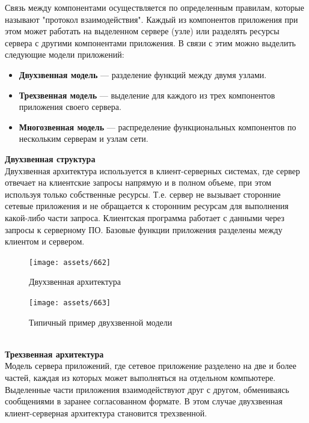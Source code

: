 Связь между компонентами осуществляется по определенным правилам, которые называют "протокол взаимодействия".
Каждый из компонентов приложения при этом может работать на выделенном сервере (узле) или разделять ресурсы сервера
с другими компонентами приложения. В связи с этим можно выделить следующие модели приложений:

\begin{itemize} 
    \item \textbf{Двухзвенная модель} — разделение функций между двумя узлами. 
    \item \textbf{Трехзвенная модель} — выделение для каждого из трех компонентов приложения своего сервера. 
    \item \textbf{Многозвенная модель} — распределение функциональных компонентов по нескольким серверам и узлам сети. \autocite[с.75-78]{Tanenbaum} 
\end{itemize}

\textbf{Двухзвенная структура}~\\

Двухзвенная архитектура используется в клиент-серверных системах, где сервер отвечает
на клиентские запросы напрямую и в полном объеме, при этом используя только
собственные ресурсы. Т.е. сервер не вызывает сторонние сетевые приложения и не
обращается к сторонним ресурсам для выполнения какой-либо части запроса. 
Клиентская программа работает с данными через запросы к серверному ПО. Базовые функции приложения разделены между клиентом и сервером.

\begin{figure}[H]
    \centering
    \texttt{[image: assets/662]}
    \caption{Двухзвенная архитектура}
\end{figure}

\begin{figure}[H]
    \centering
    \texttt{[image: assets/663]}
    \caption{Типичный пример двухзвенной модели}
\end{figure}~\\

\textbf{Трехзвенная архитектура}~\\

Модель сервера приложений, где сетевое приложение разделено на две и более частей, каждая из которых
может выполняться на отдельном компьютере. Выделенные части приложения
взаимодействуют друг с другом, обмениваясь сообщениями в заранее согласованном
формате. В этом случае двухзвенная клиент-серверная архитектура становится
трехзвенной. ~\\

